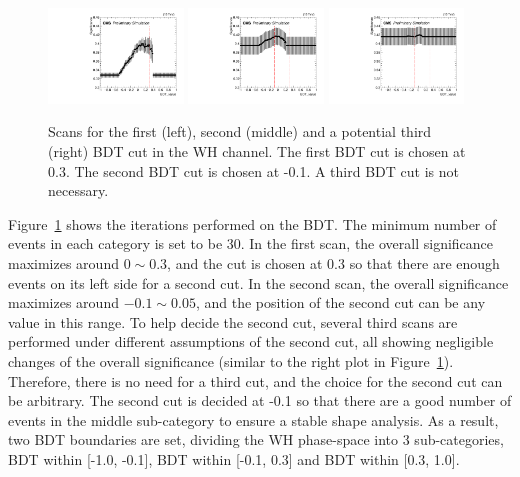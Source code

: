 \begin{figure}[!htb]
  \centering
  \captionsetup{justification=justified}
  \includegraphics[width=0.32\textwidth]{pics/VH_sec/VH_BDT_cats/WH_BDT_scan1.pdf}
  \includegraphics[width=0.32\textwidth]{pics/VH_sec/VH_BDT_cats/WH_BDT_scan2.pdf}
  \includegraphics[width=0.32\textwidth]{pics/VH_sec/VH_BDT_cats/WH_BDT_scan3.pdf}
  \caption{Scans for the first (left), second (middle) and a potential third (right) BDT cut in the WH channel.
           The first BDT cut is chosen at 0.3. The second BDT cut is chosen at -0.1. A third BDT cut is not necessary.}
  \label{fig:wh_bdt_cat_scan}
\end{figure}

Figure~\ref{fig:wh_bdt_cat_scan} shows the iterations performed on the \WH BDT. 
The minimum number of events in each category is set to be 30.
In the first scan, the overall significance maximizes around $0 \sim 0.3$, 
and the cut is chosen at 0.3 so that there are enough events on its left side for a second cut.
In the second scan, the overall significance maximizes around $-0.1 \sim 0.05$,
and the position of the second cut can be any value in this range.
To help decide the second cut, several third scans are performed under different assumptions of the second cut,
all showing negligible changes of the overall significance (similar to the right plot in Figure~\ref{fig:wh_bdt_cat_scan}).
Therefore, there is no need for a third cut, and the choice for the second cut can be arbitrary.
The second cut is decided at -0.1 so that there are a good number of events in the middle sub-category to ensure a stable shape analysis.  
As a result, two BDT boundaries are set, dividing the WH phase-space into 3 sub-categories, 
BDT within [-1.0, -0.1], BDT within [-0.1, 0.3] and BDT within [0.3, 1.0].

